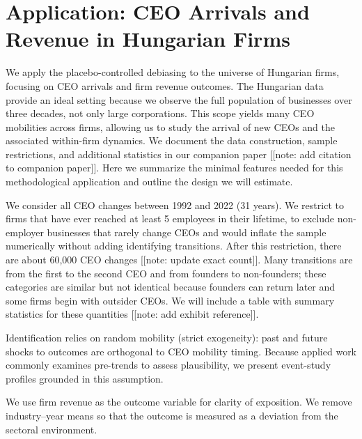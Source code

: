 \documentclass[11pt,a4paper]{article}
\begin{document}
\section{Application: CEO Arrivals and Revenue in Hungarian Firms}

We apply the placebo-controlled debiasing to the universe of Hungarian firms, focusing on CEO arrivals and firm revenue outcomes. The Hungarian data provide an ideal setting because we observe the full population of businesses over three decades, not only large corporations. This scope yields many CEO mobilities across firms, allowing us to study the arrival of new CEOs and the associated within-firm dynamics. We document the data construction, sample restrictions, and additional statistics in our companion paper [[note: add citation to companion paper]]. Here we summarize the minimal features needed for this methodological application and outline the design we will estimate.

We consider all CEO changes between 1992 and 2022 (31 years). We restrict to firms that have ever reached at least 5 employees in their lifetime, to exclude non-employer businesses that rarely change CEOs and would inflate the sample numerically without adding identifying transitions. After this restriction, there are about 60,000 CEO changes [[note: update exact count]]. Many transitions are from the first to the second CEO and from founders to non-founders; these categories are similar but not identical because founders can return later and some firms begin with outsider CEOs. We will include a table with summary statistics for these quantities [[note: add exhibit reference]].

Identification relies on random mobility (strict exogeneity): past and future shocks to outcomes are orthogonal to CEO mobility timing. Because applied work commonly examines pre-trends to assess plausibility, we present event-study profiles grounded in this assumption.

We use firm revenue as the outcome variable for clarity of exposition. We remove industry–year means so that the outcome is measured as a deviation from the sectoral environment.
\end{document}
